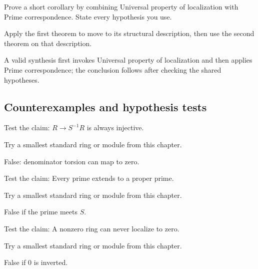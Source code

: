 \begin{exercise}\label{exr:v06-expand-09}
Prove a short corollary by combining Universal property of localization with Prime correspondence. State every hypothesis you use.
\end{exercise}
\begin{hint}
Apply the first theorem to move to its structural description, then use the second theorem on that description.
\end{hint}
\begin{solution}
A valid synthesis first invokes Universal property of localization and then applies Prime correspondence; the conclusion follows after checking the shared hypotheses.
\end{solution}

\subsection*{Counterexamples and hypothesis tests}

\begin{exercise}[Injectivity]\label{exr:v06-expand-10}
Test the claim: $R\to S^{-1}R$ is always injective.
\end{exercise}
\begin{hint}
Try a smallest standard ring or module from this chapter.
\end{hint}
\begin{solution}
False: denominator torsion can map to zero.
\end{solution}

\begin{exercise}\label{exr:v06-expand-11}
Test the claim: Every prime extends to a proper prime.
\end{exercise}
\begin{hint}
Try a smallest standard ring or module from this chapter.
\end{hint}
\begin{solution}
False if the prime meets $S$.
\end{solution}

\begin{exercise}[Collapse]\label{exr:v06-expand-12}
Test the claim: A nonzero ring can never localize to zero.
\end{exercise}
\begin{hint}
Try a smallest standard ring or module from this chapter.
\end{hint}
\begin{solution}
False if $0$ is inverted.
\end{solution}

